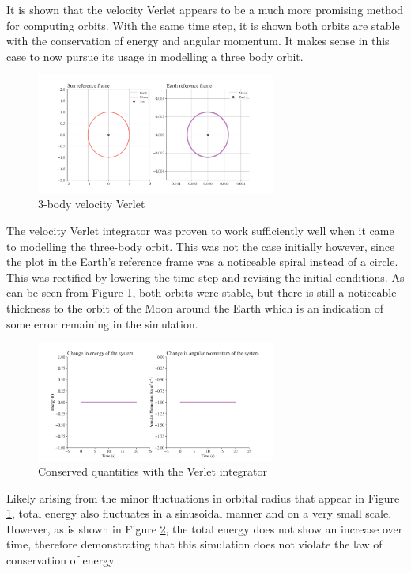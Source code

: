 \documentclass[11pt, english]{report}
\begin{document}
\normalsize{\noindent
It is shown that the velocity Verlet appears to be a much more promising method for computing orbits. With the same time step, it is shown both orbits are stable with the conservation of energy and angular momentum. It makes sense in this case to now pursue its usage in modelling a three body orbit.
}

\begin{figure}[ht]
    \centering
    \includegraphics[width=0.7\textwidth]{graphics/3b_verlet.png}
    \caption{3-body velocity Verlet}
    \label{fig:3b_verlet}
\end{figure}

\normalsize{The velocity Verlet integrator was proven to work sufficiently well when it came to modelling the three-body orbit. This was not the case initially however, since the plot in the Earth's reference frame was a noticeable spiral instead of a circle. This was rectified by lowering the time step and revising the initial conditions. As can be seen from Figure \ref{fig:3b_verlet}, both orbits were stable, but there is still a noticeable thickness to the orbit of the Moon around the Earth which is an indication of some error remaining in the simulation.
\begin{figure}[ht]
    \centering
    \includegraphics[width=0.7\textwidth]{graphics/3b_conservation.png}
    \caption{Conserved quantities with the Verlet integrator}
    \label{fig:3b_conservation}
\end{figure}

Likely arising from the minor fluctuations in orbital radius that appear in Figure \ref{fig:3b_verlet}, total energy also fluctuates in a sinusoidal manner and on a very small scale. However, as is shown in Figure \ref{fig:3b_conservation}, the total energy does not show an increase over time, therefore demonstrating that this simulation does not violate the law of conservation of energy.}
\end{document}
